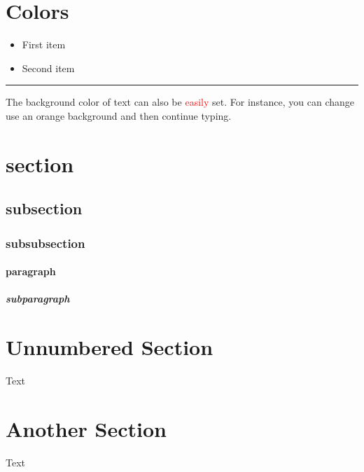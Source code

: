 \documentclass[12pt, a4paper]{article} %
\begin{document}
    \section{Colors}
        \begin{itemize}
            \color{ForestGreen}
            \item First item
            \item Second item
        \end{itemize}

        \noindent
        {\color{RubineRed} \rule{\linewidth}{0.5mm}}

        The background color of text can also be \textcolor{red}{easily} set. For
        instance, you can change use an \colorbox{BurntOrange}{orange background} and then continue typing.

    \section{section}
        \subsection{subsection}
            \subsubsection{subsubsection}
                \paragraph{paragraph}
                    \subparagraph{subparagraph}

    \section*{Unnumbered Section}
        Text

    \section{Another Section}
        Text

    
    
\end{document}
